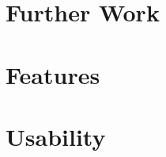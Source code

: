 \documentclass[../main.tex]{subfiles}
\begin{document}
\section{Further Work}

\section{Features}

\section{Usability}
\clearpage
\end{document}
